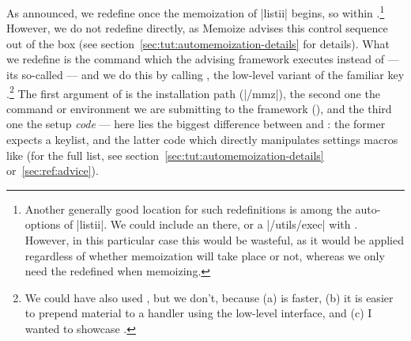 \documentclass[a4paper,11pt]{article}
\begin{document}
As announced, we redefine  once the memoization of |listii| begins,
so within .\footnote{Another generally good
  location for such redefinitions is among the auto-options of |listii|.  We
  could include an  there, or a |/utils/exec|
  with .  However, in this particular case this would be
  wasteful, as it would be applied regardless of whether memoization will take
  place or not, whereas we only need the redefined  when memoizing.}
However, we do not redefine  directly, as Memoize advises this
control sequence out of the box (see
section~\ref{sec:tut:automemoization-details} for details).  What we redefine
is the command which the advising framework executes instead of  ---
its so-called  --- and we do this by calling
, the low-level variant of the familiar key
.\footnote{We could have also used , but we don't,
  because (a)  is faster, (b) it is easier to prepend
  material to a handler using the low-level interface, and (c) I wanted to
  showcase .}  The first argument of 
is the installation path (|/mmz|), the second one the command or environment we
are submitting to the framework (), and the third one the setup
\emph{code} --- here lies the biggest difference between  and
: the former expects a keylist, and the latter 
code which directly manipulates settings macros like
 (for the full list, see
section~\ref{sec:tut:automemoization-details} or~\ref{sec:ref:advice}).

\end{document}
